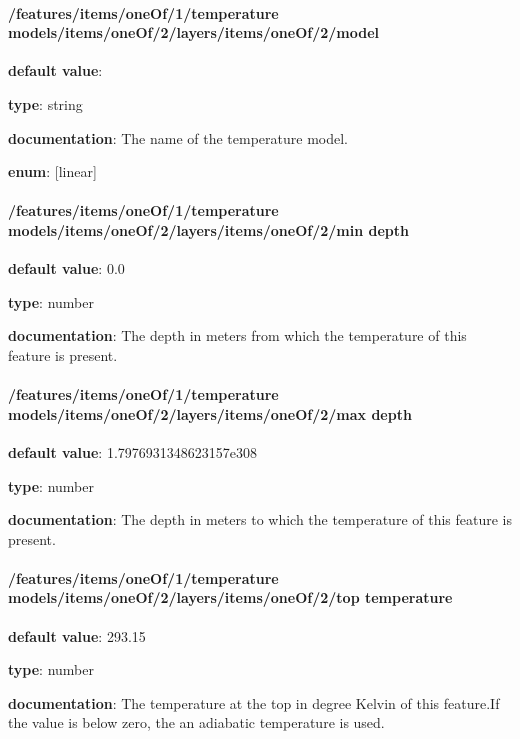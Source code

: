 \paragraph{/features/items/oneOf/1/temperature models/items/oneOf/2/layers/items/oneOf/2/model} \begin{itemized}
\item {\bf default value}: 
\item {\bf type}: string
\item {\bf documentation}: The name of the temperature model.
\item {\bf enum}: [linear]\end{itemized}\paragraph{/features/items/oneOf/1/temperature models/items/oneOf/2/layers/items/oneOf/2/min depth} \begin{itemized}
\item {\bf default value}: 0.0
\item {\bf type}: number
\item {\bf documentation}: The depth in meters from which the temperature of this feature is present.
\end{itemized}\paragraph{/features/items/oneOf/1/temperature models/items/oneOf/2/layers/items/oneOf/2/max depth} \begin{itemized}
\item {\bf default value}: 1.7976931348623157e308
\item {\bf type}: number
\item {\bf documentation}: The depth in meters to which the temperature of this feature is present.
\end{itemized}\paragraph{/features/items/oneOf/1/temperature models/items/oneOf/2/layers/items/oneOf/2/top temperature} \begin{itemized}
\item {\bf default value}: 293.15
\item {\bf type}: number
\item {\bf documentation}: The temperature at the top in degree Kelvin of this feature.If the value is below zero, the an adiabatic temperature is used.

\end{itemized}
